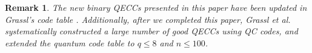 \documentclass[journal]{IEEEtran}
\newtheorem{remark}{Remark}
\begin{document}


\begin{remark}
	The new binary QECCs presented in this paper have been updated in Grassl's code table \cite{Grassltable}.  Additionally, after we completed this paper, Grassl et al. \cite{ezerman2024characterization} systematically constructed a large number of good QECCs using QC codes, and extended the quantum code table to $q\le 8$ and $n\le 100$.
\end{remark}


\end{document}
